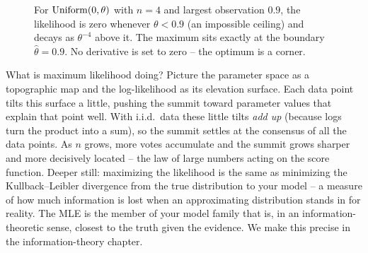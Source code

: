 \begin{figure}[H]
\centering
{}
\caption{For $\operatorname{Uniform}(0,\theta)$ with $n=4$ and largest observation $0.9$, the
likelihood is zero whenever $\theta<0.9$ (an impossible ceiling) and decays as
$\theta^{-4}$ above it. The maximum sits exactly at the boundary
$\hat\theta=0.9$. No derivative is set to zero -- the optimum is a corner.}
\label{ch30:fig-unif-lik}
\end{figure}

\begin{happeningbox}
What is maximum likelihood doing? Picture the parameter space as a
topographic map and the log-likelihood as its elevation surface. Each data point
tilts this surface a little, pushing the summit toward parameter values that
explain that point well. With i.i.d.\ data these little tilts \emph{add up}
(because logs turn the product into a sum), so the summit settles at the
consensus of all the data points. As $n$ grows, more votes accumulate and the
summit grows sharper and more decisively located -- the law of large numbers
acting on the score function. Deeper still: maximizing the likelihood is the
same as minimizing the Kullback--Leibler divergence from the true distribution
to your model -- a measure of how much information is lost when an approximating
distribution stands in for reality. The MLE is the member of your model family
that is, in an information-theoretic sense, closest to the truth given
the evidence. We make this precise in the information-theory chapter.
\end{happeningbox}


